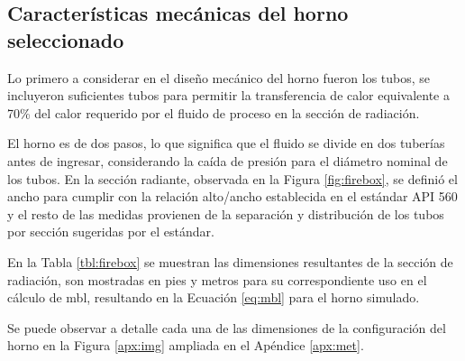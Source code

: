 \subsection{Características mecánicas del horno seleccionado}
\par Lo primero a considerar en el diseño mecánico del horno fueron los tubos, se incluyeron suficientes tubos para permitir la transferencia de calor equivalente a 70\% del calor requerido por el fluido de proceso en la sección de radiación.
\par El horno es de dos pasos, lo que significa que el fluido se divide en dos tuberías antes de ingresar, considerando la caída de presión para el diámetro nominal de los tubos. En la sección radiante, observada en la Figura \ref{fig:firebox}, se definió el ancho para cumplir con la relación alto/ancho establecida en el estándar API 560 \cite{bib:api560} y el resto de las medidas provienen de la separación y distribución de los tubos por sección sugeridas por el estándar.
\par En la Tabla \ref{tbl:firebox} se muestran las dimensiones resultantes de la sección de radiación, son mostradas en pies y metros para su correspondiente uso en el cálculo de \ac{mbl}, resultando en la Ecuación \ref{eq:mbl} para el horno simulado.
\par Se puede observar a detalle cada una de las dimensiones de la configuración del horno en la Figura \ref{apx:img} ampliada en el Apéndice \ref{apx:met}.
